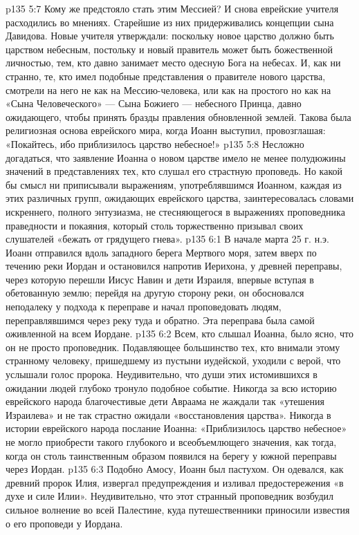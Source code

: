 \vs p135 5:7 Кому же предстояло стать этим Мессией? И снова еврейские учителя расходились во мнениях. Старейшие из них придерживались концепции сына Давидова. Новые учителя утверждали: поскольку новое царство должно быть царством небесным, постольку и новый правитель может быть божественной личностью, тем, кто давно занимает место одесную Бога на небесах. И, как ни странно, те, кто имел подобные представления о правителе нового царства, смотрели на него не как на Мессию\hyp{}человека, или как на простого  но как на «Сына Человеческого» --- Сына Божиего --- небесного Принца, давно ожидающего, чтобы принять бразды правления обновленной землей. Такова была религиозная основа еврейского мира, когда Иоанн выступил, провозглашая: «Покайтесь, ибо приблизилось царство небесное!»
\vs p135 5:8 Несложно догадаться, что заявление Иоанна о новом царстве имело не менее полудюжины значений в представлениях тех, кто слушал его страстную проповедь. Но какой бы смысл ни приписывали выражениям, употреблявшимся Иоанном, каждая из этих различных групп, ожидающих еврейского царства, заинтересовалась словами искреннего, полного энтузиазма, не стесняющегося в выражениях проповедника праведности и покаяния, который столь торжественно призывал своих слушателей «бежать от грядущего гнева».
\vs p135 6:1 В начале марта 25 г. н.э. Иоанн отправился вдоль западного берега Мертвого моря, затем вверх по течению реки Иордан и остановился напротив Иерихона, у древней переправы, через которую перешли Иисус Навин и дети Израиля, впервые вступая в обетованную землю; перейдя на другую сторону реки, он обосновался неподалеку у подхода к переправе и начал проповедовать людям, переправлявшимся через реку туда и обратно. Эта переправа была самой оживленной на всем Иордане.
\vs p135 6:2 Всем, кто слышал Иоанна, было ясно, что он не просто проповедник. Подавляющее большинство тех, кто внимали этому странному человеку, пришедшему из пустыни иудейской, уходили с верой, что услышали голос пророка. Неудивительно, что души этих истомившихся в ожидании людей глубоко тронуло подобное событие. Никогда за всю историю еврейского народа благочестивые дети Авраама не жаждали так «утешения Израилева» и не так страстно ожидали «восстановления царства». Никогда в истории еврейского народа послание Иоанна: «Приблизилось царство небесное» не могло приобрести такого глубокого и всеобъемлющего значения, как тогда, когда он столь таинственным образом появился на берегу у южной переправы через Иордан.
\vs p135 6:3 Подобно Амосу, Иоанн был пастухом. Он одевался, как древний пророк Илия, извергал предупреждения и изливал предостережения «в духе и силе Илии». Неудивительно, что этот странный проповедник возбудил сильное волнение во всей Палестине, куда путешественники приносили известия о его проповеди у Иордана.
